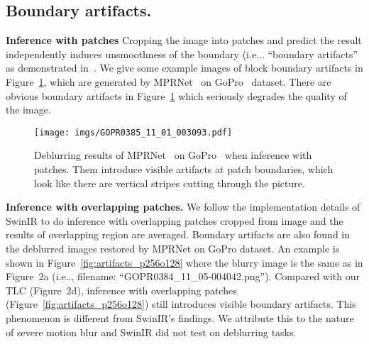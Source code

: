 \documentclass[runningheads]{llncs}
\makeatletter
\DeclareRobustCommand\onedot{\futurelet\@let@token\@onedot}
\def\@onedot{\ifx\@let@token.\else.\null\fi\xspace}
\def\ie{i.e\onedot}
\makeatother
\begin{document}
\subsection{Boundary artifacts.}   \label{sec:artifacts}
\noindent\textbf{Inference with patches}
Cropping the image into patches and predict the result independently induces unsmoothness of the boundary (\ie. ``boundary artifacts'' as demonstrated in~\cite{lee2015block}. We give some example images of block boundary artifacts in Figure~\ref{fig:artifacts}, which are generated by MPRNet~\cite{zamir2021multi} on GoPro~\cite{nah2017deep} dataset. There are obvious boundary artifacts in Figure~\ref{fig:artifacts} which seriously degrades the quality of the image.
 
\begin{figure}[t]
\centering
\texttt{[image: imgs/GOPR0385\_11\_01\_003093.pdf]}
\caption{
Deblurring results of MPRNet~\cite{zamir2021multi} on GoPro~\cite{nah2017deep}  when inference with patches. Them introduce visible artifacts at patch boundaries, which look like there are vertical stripes cutting through the picture. 
}
\vspace{-2mm}
\label{fig:artifacts}
\end{figure}

\noindent\textbf{Inference with overlapping patches.}
We follow the implementation details of SwinIR to do inference with overlapping  patches cropped from image and the results of overlapping region are averaged. Boundary artifacts are also found in the deblurred images restored by MPRNet on GoPro dataset. An example is shown in Figure~\ref{fig:artifacts_p256o128} where the blurry image is the same as in Figure~2a (\ie, filename: ``GOPR0384\_11\_05-004042.png''). Compared with our TLC (Figure~2d), inference with overlapping patches (Figure~\ref{fig:artifacts_p256o128}) still introduces visible boundary artifacts.
This phenomenon is different from SwinIR's findings. We attribute this to the nature of severe motion blur and SwinIR did not test on deblurring tasks.
\end{document}
